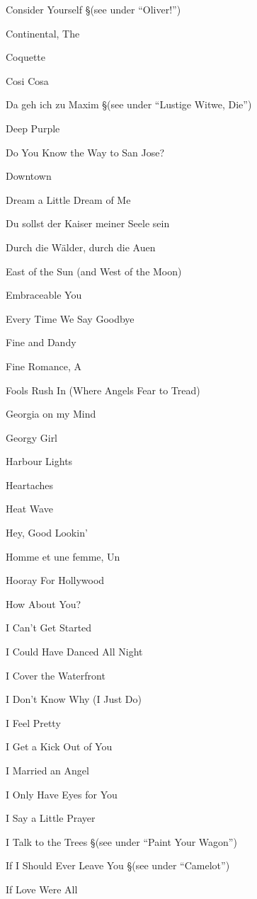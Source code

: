 \N Consider Yourself
\nobreak
\S (see under ``Oliver!'')

\N Continental, The

\N Coquette

\N Cosi Cosa

\N Da geh ich zu Maxim
\nobreak
\S (see under ``Lustige Witwe, Die'')

\N Deep Purple

\N Do You Know the Way to San Jose?

\N Downtown

\N Dream a Little Dream of Me

\N Du sollst der Kaiser meiner Seele sein

\N Durch die W{\"a}lder, durch die Auen

\N East of the Sun (and West of the Moon)

\N Embraceable You

\N Every Time We Say Goodbye

\N Fine and Dandy

\N Fine Romance, A

\N Fools Rush In (Where Angels Fear to Tread)

\N Georgia on my Mind

\N Georgy  Girl

\N Harbour Lights

\N Heartaches

\N Heat Wave

\N Hey, Good Lookin'

\N Homme et une femme, Un

\N Hooray For Hollywood

\N How About You?

\N I Can't Get Started

\N I Could Have Danced All Night

\N I Cover the Waterfront

\N I Don't Know Why (I Just Do)

\N I Feel Pretty

\N I Get a Kick Out of You

\N I Married an Angel

\N I Only Have Eyes for You

\N I Say a Little Prayer

\N I Talk to the Trees
\nobreak
\S (see under ``Paint Your Wagon'')

\N If I Should Ever Leave You
\nobreak
\S (see under ``Camelot'')

\N If Love Were All

